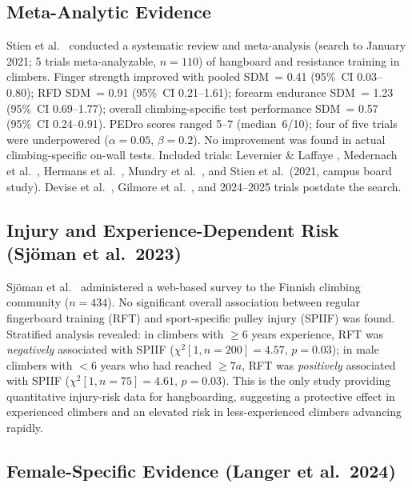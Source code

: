 \documentclass[12pt,a4paper]{article}
\begin{document}
\subsection{Meta-Analytic Evidence}

\begin{evidencebox}
Stien et al.\ \cite{stien2023} conducted a systematic review and meta-analysis (search to January 2021; 5 trials meta-analyzable, $n=110$) of hangboard and resistance training in climbers. Finger strength improved with pooled SDM~= 0.41 (95\%~CI 0.03--0.80); RFD SDM~= 0.91 (95\%~CI 0.21--1.61); forearm endurance SDM~= 1.23 (95\%~CI 0.69--1.77); overall climbing-specific test performance SDM~= 0.57 (95\%~CI 0.24--0.91). PEDro scores ranged 5--7 (median~6/10); four of five trials were underpowered ($\alpha = 0.05$, $\beta = 0.2$). No improvement was found in actual climbing-specific on-wall tests. Included trials: Levernier \& Laffaye \cite{levernier2019}, Medernach et al.\ \cite{medernach2015}, Hermans et al.\ \cite{hermans2022}, Mundry et al.\ \cite{mundry2021}, and Stien et al.\ (2021, campus board study). Devise et al.\ \cite{devise2022}, Gilmore et al.\ \cite{gilmore2024}, and 2024--2025 trials postdate the search.
\end{evidencebox}

\subsection{Injury and Experience-Dependent Risk (Sjöman et al.\ 2023)}

\begin{evidencebox}
Sjöman et al.\ \cite{sjoman2023} administered a web-based survey to the Finnish climbing community ($n=434$). No significant overall association between regular fingerboard training (RFT) and sport-specific pulley injury (SPIIF) was found. Stratified analysis revealed: in climbers with $\geq6$ years experience, RFT was \emph{negatively} associated with SPIIF ($\chi^2[1, n=200]=4.57$, $p=0.03$); in male climbers with $<6$ years who had reached $\geq7a$, RFT was \emph{positively} associated with SPIIF ($\chi^2[1, n=75]=4.61$, $p=0.03$). This is the only study providing quantitative injury-risk data for hangboarding, suggesting a protective effect in experienced climbers and an elevated risk in less-experienced climbers advancing rapidly.
\end{evidencebox}

\subsection{Female-Specific Evidence (Langer et al.\ 2024)}
\end{document}
